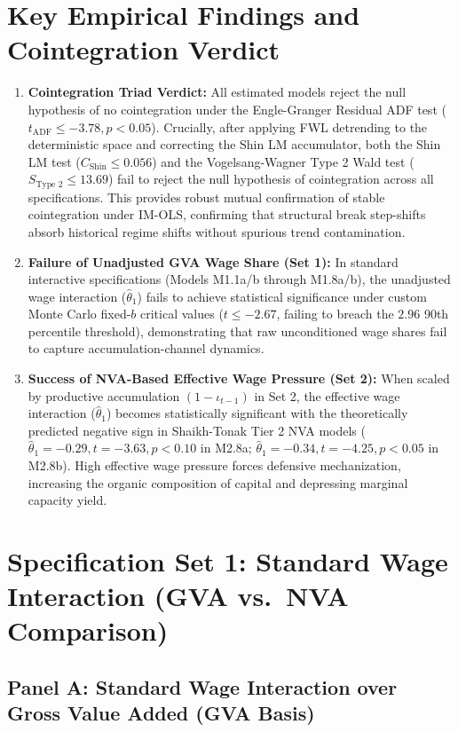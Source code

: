 \documentclass[11pt,a4paper]{article}
\begin{document}
\section*{Key Empirical Findings and Cointegration Verdict}
\begin{enumerate}
    \item \textbf{Cointegration Triad Verdict:} All estimated models reject the null hypothesis of no cointegration under the Engle-Granger Residual ADF test ($t_{\text{ADF}} \le -3.78, p < 0.05$). Crucially, after applying FWL detrending to the deterministic space and correcting the Shin LM accumulator, both the Shin LM test ($C_{\text{Shin}} \le 0.056$) and the Vogelsang-Wagner Type 2 Wald test ($S_{\text{Type 2}} \le 13.69$) fail to reject the null hypothesis of cointegration across all specifications. This provides robust mutual confirmation of stable cointegration under IM-OLS, confirming that structural break step-shifts absorb historical regime shifts without spurious trend contamination.
    \item \textbf{Failure of Unadjusted GVA Wage Share (Set 1):} In standard interactive specifications (Models M1.1a/b through M1.8a/b), the unadjusted wage interaction ($\hat{\theta}_1$) fails to achieve statistical significance under custom Monte Carlo fixed-$b$ critical values ($t \le -2.67$, failing to breach the $2.96$ 90th percentile threshold), demonstrating that raw unconditioned wage shares fail to capture accumulation-channel dynamics.
    \item \textbf{Success of NVA-Based Effective Wage Pressure (Set 2):} When scaled by productive accumulation $(1-\iota_{t-1})$ in Set 2, the effective wage interaction ($\hat{\theta}_1$) becomes statistically significant with the theoretically predicted negative sign in Shaikh-Tonak Tier 2 NVA models ($\hat{\theta}_1 = -0.29, t = -3.63, p < 0.10$ in M2.8a; $\hat{\theta}_1 = -0.34, t = -4.25, p < 0.05$ in M2.8b). High effective wage pressure forces defensive mechanization, increasing the organic composition of capital and depressing marginal capacity yield.
\end{enumerate}

\FloatBarrier
\section{Specification Set 1: Standard Wage Interaction (GVA vs.\ NVA Comparison)}

\subsection{Panel A: Standard Wage Interaction over Gross Value Added (GVA Basis)}
\FloatBarrier

\end{document}
